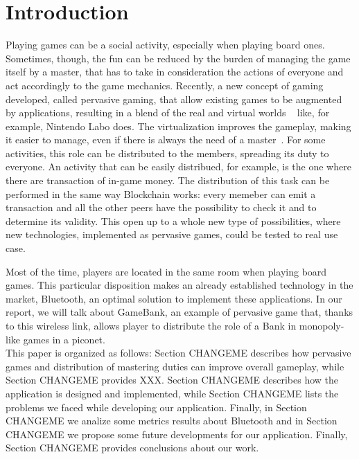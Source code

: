 \section{Introduction}

Playing games can be a social activity, especially when playing board ones. 
Sometimes, though, the fun can be reduced by the burden of managing the 
game itself by a master, that has to take in consideration the actions of 
everyone and act accordingly to the game mechanics. Recently, a new  concept of 
gaming developed, called pervasive gaming, that allow existing games to be 
augmented by applications, resulting in a blend of the real and virtual worlds 
~\cite{arango17} like, for example, Nintendo Labo does.
The virtualization improves the gameplay, making it easier to manage, even if 
there is always the need of a master~\cite{bjork01}.
For some activities, this role can be distributed to the members, spreading its 
duty to everyone. An activity that can be easily distribued, for example, is the 
one where there are transaction of in-game money. The distribution of this task 
can be performed in the same way Blockchain works: every memeber can emit a 
transaction and all the other peers have the possibility to check it and to 
determine its validity. This open up to a whole new type of possibilities, where 
new technologies, implemented as pervasive games, could be tested to real use 
case.

Most of the time, players are located in the same room when playing board 
games. This particular disposition makes an already established technology in 
the market, Bluetooth, an optimal solution to implement these applications. In 
our report, we will talk about GameBank, an example of pervasive game that, 
thanks to this wireless link, allows player to distribute the role of a Bank in 
monopoly-like games in a piconet.\\

 This paper is organized as follows: Section 
CHANGEME describes how pervasive games and distribution of mastering duties can 
improve overall gameplay, while Section CHANGEME provides XXX. Section CHANGEME describes how the application 
is designed and implemented, while Section CHANGEME lists the problems we faced 
while developing our application. Finally, in Section CHANGEME we analize some 
metrics results about Bluetooth and in Section CHANGEME we propose some future 
developments for our application. Finally, Section CHANGEME provides conclusions 
about our work.